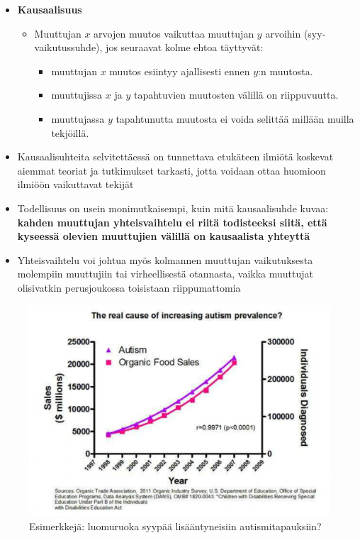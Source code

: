 \documentclass[
]{book}
\providecommand{\tightlist}{%
  \setlength{\itemsep}{0pt}\setlength{\parskip}{0pt}}
\begin{document}
\FloatBarrier

\begin{itemize}
\item
  \textbf{Kausaalisuus}

  \begin{itemize}
  \tightlist
  \item
    Muuttujan \(x\) arvojen muutos vaikuttaa muuttujan \(y\) arvoihin (syy-vaikutussuhde), jos seuraavat kolme ehtoa täyttyvät:

    \begin{itemize}
    \tightlist
    \item
      muuttujan \(x\) muutos esiintyy ajallisesti ennen \(y\):n muutosta.
    \item
      muuttujissa \(x\) ja \(y\) tapahtuvien muutosten välillä on riippuvuutta.
    \item
      muuttujassa \(y\) tapahtunutta muutosta ei voida selittää millään muilla tekjöillä.
    \end{itemize}
  \end{itemize}
\item
  Kausaalisuhteita selvitettäessä on tunnettava etukäteen ilmiötä koskevat aiemmat teoriat ja tutkimukset tarkasti, jotta voidaan ottaa huomioon ilmiöön vaikuttavat tekijät
\item
  Todellisuus on usein monimutkaisempi, kuin mitä kausaalisuhde kuvaa: \textbf{kahden muuttujan yhteisvaihtelu ei riitä todisteeksi siitä, että kyseessä olevien muuttujien välillä on kausaalista yhteyttä}
\item
  Yhteisvaihtelu voi johtua myös kolmannen muuttujan vaikutuksesta molempiin muuttujiin tai virheellisestä otannasta, vaikka muuttujat olisivatkin perusjoukossa toisistaan riippumattomia
\end{itemize}

\FloatBarrier

\begin{figure}

{\centering \includegraphics[width=0.75\linewidth]{images/causality2} 

}

\caption{Esimerkkejä: luomuruoka syypää lisääntyneisiin autismitapauksiin?}\label{fig:unnamed-chunk-7}
\end{figure}
\end{document}
